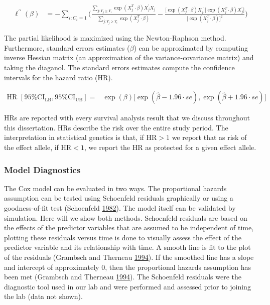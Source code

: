 \documentclass[]{DissertateOSU}
\begin{document}
\begin{equation}
\begin{split}
\ell^{\prime\prime}(\beta) & = -\sum_{i:C_{i}=1}\Bigg(\frac{\sum_{j:Y_{j}\geq Y_{i}}\exp(X_{j}^{T} \cdot \beta)X_{j}^{\prime}X_{j}}{\sum_{j:Y_{j}\geq Y_{i}}\exp(X_{j}^{T} \cdot \beta)} - \frac{\big[\exp(X_{j}^{T} \cdot \beta) X_{j} \big] \big[\exp(X_{j}^{T} \cdot \beta) X^{\prime}_{j} \big]}{ \big[\exp(X_{j}^{T} \cdot \beta)\big]^{2}}\Bigg)
\end{split}
\end{equation}

The partial likelihood is maximized using the Newton-Raphson method.
Furthermore, standard errors estimates (\(\beta\)) can be approximated
by computing inverse Hessian matrix (an approximation of the
variance-covariance matrix) and taking the diaganol. The standard errors
estimates compute the confidence intervals for the hazard ratio (HR).

\begin{equation}
\begin{split}
\text{HR } [95\%\text{CI}_{\text{LB}}, 95\%\text{CI}_{\text{UB}}] = & \exp(\beta) \big[ \exp(\hat{\beta} - 1.96 \cdot se), \exp(\hat{\beta} + 1.96 \cdot se)\big]
\end{split}
\end{equation}

HRs are reported with every survival analysis result that we discuss
throughout this dissertation. HRs describe the risk over the entire
study period. The interpretation in statistical genetics is that, if
\(\text{HR} > 1\) we report that as risk of the effect allele, if
\(\text{HR} < 1\), we report the HR as protected for a given effect
allele.

\subsubsection{Model Diagnostics}\label{model-diagnostics}

The Cox model can be evaluated in two ways. The proportional hazards
assumption can be tested using Schoenfeld residuals graphically or using
a goodness-of-fit test (Schoenfeld
\protect\hyperlink{ref-schoenfeld1982}{1982}). The model itself can be
validated by simulation. Here will we show both methods. Schoenfeld
residuals are based on the effects of the predictor variables that are
assumed to be independent of time, plotting these residuals versus time
is done to visually assess the effect of the predictor variable and its
relationship with time. A smooth line is fit to the plot of the
residuals (Grambsch and Therneau
\protect\hyperlink{ref-grambsch_ph}{1994}). If the smoothed line has a
slope and intercept of approximately 0, then the proportional hazards
assumption has been met (Grambsch and Therneau
\protect\hyperlink{ref-grambsch_ph}{1994}). The Schoenfeld residuals
were the diagnostic tool used in our lab and were performed and assessed
prior to joining the lab (data not shown).
\end{document}
